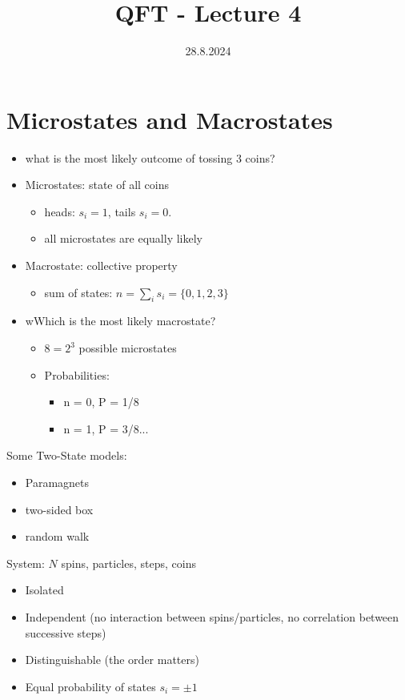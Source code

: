 \documentclass[]{scrartcl}
\title{QFT - Lecture 4}
\author{}
\date{28.8.2024}
\begin{document}
\maketitle
\newpage
\tableofcontents
\newpage

\section{Microstates and Macrostates}
\begin{itemize}
	\item what is the most likely outcome of tossing 3 coins?
	\item Microstates: state of all coins
		\begin{itemize}
			\item heads: $s_i = 1$, tails $s_i = 0$.
			\item all microstates are equally likely
		\end{itemize}
	\item Macrostate: collective property
		\begin{itemize}
			\item sum of states: $n = \sum_i s_i = \{0,1,2,3\}$
		\end{itemize}
	\item wWhich is the most likely macrostate?
		\begin{itemize}
			\item $8 = 2^3$ possible microstates
			\item Probabilities:
				\begin{itemize}
					\item n = 0, P = 1/8
					\item n = 1, P = 3/8...
				\end{itemize}
		\end{itemize}
\end{itemize}

Some Two-State models:
\begin{itemize}
	\item Paramagnets
	\item two-sided box
	\item random walk
\end{itemize}
System: $N$ spins, particles, steps, coins
\begin{itemize}
	\item Isolated
	\item Independent (no interaction between spins/particles, no correlation between successive steps)
	\item Distinguishable (the order matters)
	\item Equal probability of states $s_i = \pm1$
\end{itemize}
\end{document}
